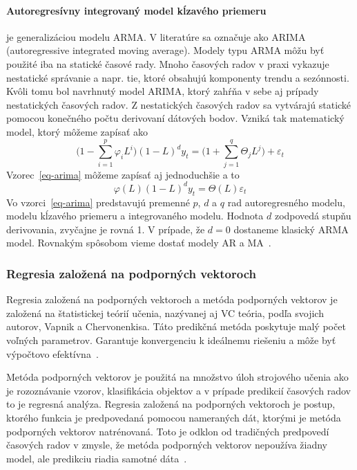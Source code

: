 \documentclass[a4paper,slovak,12pt,appendix]{article}
\begin{document}
\paragraph{Autoregresívny integrovaný model kĺzavého priemeru} je
generalizáciou modelu ARMA. V literatúre sa označuje ako ARIMA (autoregressive
integrated moving average). Modely typu ARMA môžu byť použité iba na statické
časové rady. Mnoho časových radov v praxi vykazuje nestatické správanie a napr.
tie, ktoré obsahujú komponenty trendu a sezónnosti. Kvôli tomu bol navrhnutý
model ARIMA, ktorý zahŕňa v sebe aj prípady nestatických časových radov.
Z nestatických časových radov sa vytvárajú statické pomocou konečného počtu
derivovaní dátových bodov. Vzniká tak matematický model, ktorý môžeme zapísať
ako
\begin{equation}
  \Big( 1 - \sum_{i=1}^{p} \varphi_i L^i \Big) (1-L)^d y_t = \Big( 1 + \sum_{j=1}^{q} \Theta_j L^j \Big) + \varepsilon_t
  \label{eq-arima}
\end{equation}
Vzorec~\ref{eq-arima} môžeme zapísať aj jednoduchšie a to
\begin{equation}
  \varphi(L) (1-L)^d y_t = \Theta(L) \varepsilon_t
  \label{eq-arima-short}
\end{equation}
Vo vzorci~\ref{eq-arima} predstavujú premenné $p$, $d$ a $q$ rad autoregresného
modelu, modelu kĺzavého priemeru a integrovaného modelu. Hodnota $d$ zodpovedá
stupňu derivovania, zvyčajne je rovná 1. V prípade, že $d=0$ dostaneme klasický
ARMA model. Rovnakým spôsobom vieme dostať modely AR a MA~\cite{Agrawal2013}.


\subsubsection{Regresia založená na podporných vektoroch}
Regresia založená na podporných vektoroch a metóda podporných vektorov je
založená na štatistickej teórií učenia, nazývanej aj VC teória, podľa svojich
autorov, Vapnik a Chervonenkisa. Táto predikčná metóda poskytuje malý počet
voľných parametrov. Garantuje konvergenciu k ideálnemu riešeniu a môže byť
výpočtovo efektívna~\cite{Sapankevych2009}.

Metóda podporných vektorov je použitá na množstvo úloh strojového učenia ako je
rozoznávanie vzorov, klasifikácia objektov a v prípade predikcií časových
radov to je regresná analýza. Regresia založená na podporných vektoroch je
postup, ktorého funkcia je predpovedaná pomocou nameraných dát, ktorými je
metóda podporných vektorov natrénovaná. Toto je odklon od tradičných predpovedí
časových radov v zmysle, že metóda podporných vektorov nepoužíva žiadny model,
ale predikciu riadia samotné dáta~\cite{Sapankevych2009}.
\end{document}
